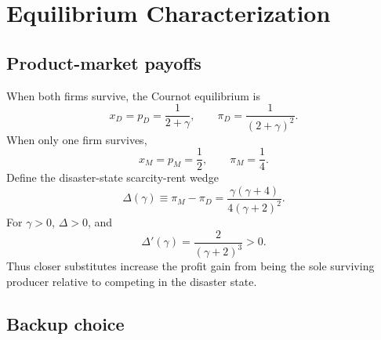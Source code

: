 \section{Equilibrium Characterization}\label{sec:equilibrium}

\subsection{Product-market payoffs}

When both firms survive, the Cournot equilibrium is
\begin{equation}
x_D=p_D=\frac{1}{2+\gamma},
\qquad
\pi_D=\frac{1}{(2+\gamma)^2}.
\label{eq:duopoly}
\end{equation}
When only one firm survives,
\begin{equation}
x_M=p_M=\frac12,
\qquad
\pi_M=\frac14.
\label{eq:monopoly}
\end{equation}
Define the disaster-state scarcity-rent wedge
\begin{equation}
\Delta(\gamma)\equiv \pi_M-\pi_D
=\frac{\gamma(\gamma+4)}{4(\gamma+2)^2}.
\label{eq:delta}
\end{equation}
For $\gamma>0$, $\Delta>0$, and
\begin{equation}
\Delta'(\gamma)=\frac{2}{(\gamma+2)^3}>0.
\label{eq:delta-derivative}
\end{equation}
Thus closer substitutes increase the profit gain from being the sole surviving producer relative to competing in the disaster state.

\subsection{Backup choice}

